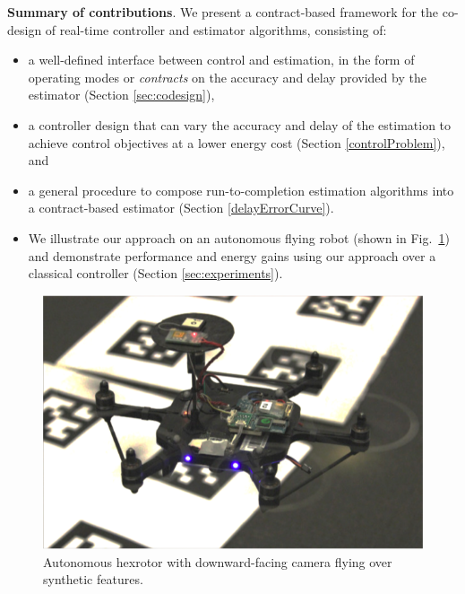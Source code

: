 \textbf{Summary of contributions}.
We present a contract-based framework for the co-design of real-time controller and estimator algorithms, consisting of:
\begin{itemize}
	\item a well-defined interface between control and estimation, in the form of operating modes or \emph{contracts} on the accuracy and delay provided by the estimator (Section \ref{sec:codesign}),
	\item a controller design that can vary the accuracy and delay of the estimation to achieve control objectives at a lower energy cost (Section \ref{controlProblem}), and
	\item a general procedure to compose run-to-completion estimation algorithms into a contract-based estimator (Section \ref{delayErrorCurve}).
	\item We illustrate our approach on an autonomous flying robot (shown in Fig.~\ref{fig:nanohex}) and demonstrate performance and energy gains using our approach over a classical controller (Section \ref{sec:experiments}).
\end{itemize}
\begin{figure}[t]
	\centering
	\includegraphics[width=0.7\linewidth]{figures/nanohex2}
	\caption{Autonomous hexrotor with downward-facing camera flying over synthetic features.}
	\label{fig:nanohex}
\end{figure}